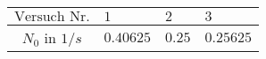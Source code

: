 \begin{tabular}{c|*{3}{*{1}{l}}}
$\text{Versuch Nr.}$ & $1$ & $2$ & $3$ \\ \hline
$N_0$ in $\si{1/s}$ & $0.40625$ & $0.25$ & $0.25625$\end{tabular}
